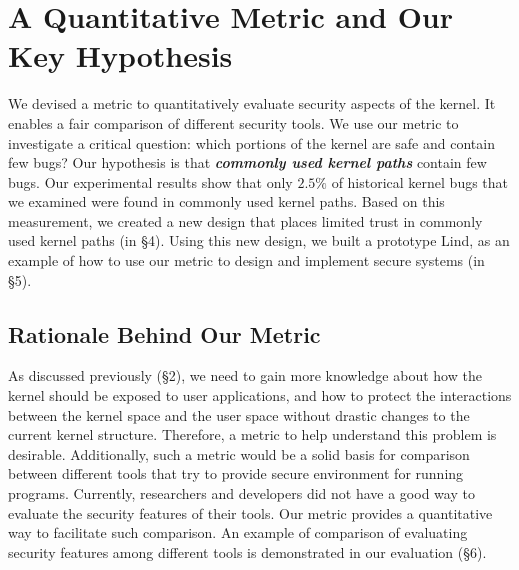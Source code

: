 \section{A Quantitative Metric and Our Key Hypothesis}
\label{sec.metric}
We devised a metric to quantitatively evaluate security aspects of the kernel. 
It enables a fair comparison of different security tools. 
We use our metric to investigate a critical question: which portions of the kernel are safe and 
contain few bugs? Our hypothesis is that \textbf{\textit{commonly used kernel paths}} contain few bugs. 
Our experimental results show that only $2.5\%$ of historical kernel bugs that we examined were 
found in commonly used kernel paths. Based on this measurement, we created a new design that 
places limited trust in commonly used kernel paths (in \S{4}). Using this new design, we built a prototype 
Lind, as an example of how to use our metric to design and implement secure systems (in \S{5}). 

\subsection{Rationale Behind Our Metric}
As discussed previously (\S{2}), %
we need to gain more knowledge about how the kernel should be exposed to user applications, 
and how to protect the interactions between the kernel space and 
the user space without drastic changes to the current kernel structure. 
Therefore, a metric to help understand this problem is desirable. 
%
Additionally, such a metric would be a solid basis for comparison between different tools that try to 
provide secure environment for running programs. 
Currently, researchers and developers did not have a good way to evaluate the security features 
of their tools. 
Our metric provides a quantitative way to 
facilitate such comparison. An example of comparison of evaluating security features among different tools is 
demonstrated in our evaluation (\S{6}).

